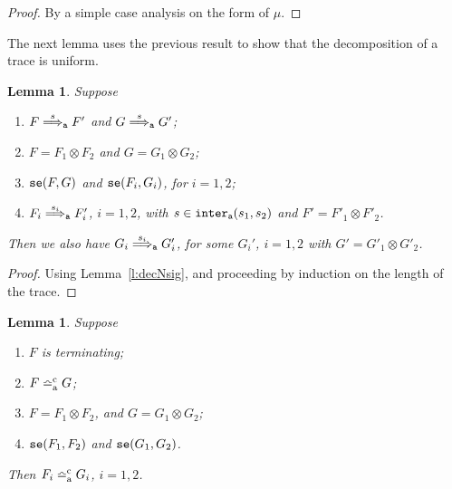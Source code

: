 \documentclass[11pt,a4paper]{amsart}
\theoremstyle{plain}
\theoremstyle{definition}
\theoremstyle{defC}
\theoremstyle{thmC}
\theoremstyle{plain}
\numberwithin{equation}{section}
\newcommand{\tr}{s}
\newcommand{\okC}[2]{{\tt se}(#1,#2)}  %
\newcommand{\rmm}[1]{{\tt{\lowercase{#1}}}}
\newcommand{\genArr}[2]{\mathrel{\stackrel{{#1}}{\Longrightarrow}_{\rmm{\lowercase{#2}}}}}  %
\newcommand{\ArrA}[1]{\genArr{#1}{A}}  %
\newcommand{\genTEcomp}[1]{\mathrel{\bumpeq^{\rm c}_{\rm{\lowercase{#1}}}}} %
\newcommand{\TEc}{\genTEcomp{A}}        %
\newcommand{\interlA}[2]{{\tt inter_{a}}( #1, #2)}
\newcommand{\FF}{F}
\newcommand{\GG}{G}
\theoremstyle{plain}
\newtheorem{lemma}[thm]{Lemma}
\theoremstyle{definition}
\begin{document}
\begin{proof}
By a simple case analysis on the form of $\mu$.
\end{proof} 
\noindent
The next lemma uses the previous result to show that the decomposition of a trace 
is uniform.

\begin{lemma}
\label{l:decNsig2}
Suppose 
\begin{enumerate}
\item
$\FF \ArrA \tr   \FF'$
and $\GG \ArrA \tr   \GG'$;
\item  
 $\FF = \FF_1 \otimes \FF_2$ and 
 $\GG = \GG_1 \otimes \GG_2$;  
\item 
  $\okC{\FF}{\GG}$ and  
  $\okC{\FF_i}{\GG_i}$, for $i=1,2$;   
\item 
$\FF_i \ArrA{\tr_i}  \FF_i'$, $i=1,2$,  with $\tr \in \interlA{\tr_1}{\tr_2}$ and 
 $\FF' = \FF'_1 \otimes \FF'_2$.
\end{enumerate} 
Then we also have 
$\GG_i \ArrA{\tr_i}   \GG_i'$, for some $\GG_i'$, 
$i=1,2$ with 
 $\GG' = \GG'_1 \otimes \GG'_2$.
\end{lemma} 


\begin{proof}
  Using Lemma~\ref{l:decNsig}, and proceeding by induction on the length of the trace.  
\end{proof} 


\begin{lemma}
\label{l:decACN}
 Suppose 
 \begin{enumerate}
   \item $\FF$ is terminating;
   \item 
   $\FF  \TEc \GG$; 
   \item 
   $\FF = \FF_1 \otimes \FF_2$,   
   and  
   $\GG = \GG_1 \otimes \GG_2$;
   \item $\okC{\FF_1}{\FF_2}$ and $\okC{\GG_1}{\GG_2}$.
 \end{enumerate} 
 Then
 $\FF_i \TEc \GG_i$, $i=1,2$. 
\end{lemma}  
\end{document}

